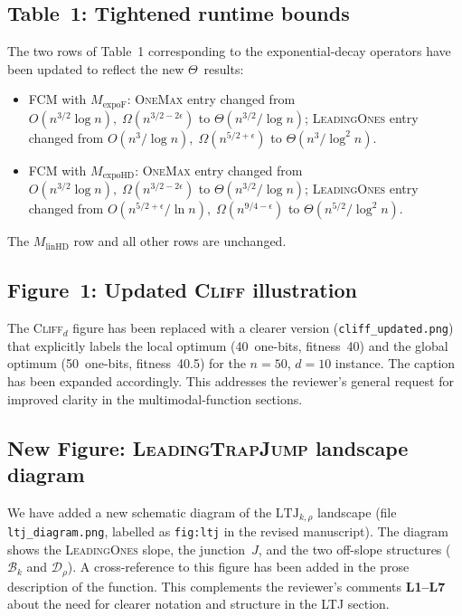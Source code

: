 \documentclass[11pt]{article}
\newcommand{\resp}[1]{\smallskip\noindent #1\medskip}
\begin{document}
\subsection*{Table~1: Tightened runtime bounds}

\resp{The two rows of Table~1 corresponding to the exponential-decay
operators have been updated to reflect the new $\Theta$~results:
\begin{itemize}[nosep]
\item FCM with $M_{\text{expoF}}$: \textsc{OneMax} entry changed from
      $O(n^{3/2}\log n),\;\Omega(n^{3/2-2\epsilon})$ to
      $\Theta(n^{3/2}/\!\log n)$; \textsc{LeadingOnes} entry changed from
      $O(n^3/\!\log n),\;\Omega(n^{5/2+\epsilon})$ to
      $\Theta(n^3/\!\log^2 n)$.
\item FCM with $M_{\text{expoHD}}$: \textsc{OneMax} entry changed from
      $O(n^{3/2}\log n),\;\Omega(n^{3/2-2\epsilon})$ to
      $\Theta(n^{3/2}/\!\log n)$; \textsc{LeadingOnes} entry changed from
      $O(n^{5/2+\epsilon}/\!\ln n),\;\Omega(n^{9/4-\epsilon})$ to
      $\Theta(n^{5/2}/\!\log^2 n)$.
\end{itemize}
The $M_{\text{linHD}}$ row and all other rows are unchanged.}

\subsection*{Figure~1: Updated \textsc{Cliff} illustration}

\resp{The \textsc{Cliff}$_d$ figure has been replaced with a clearer version
(\texttt{cliff\_updated.png}) that explicitly labels the local optimum
(40~one-bits, fitness~40) and the global optimum (50~one-bits, fitness~40.5)
for the $n=50$, $d=10$ instance.  The caption has been expanded accordingly.
This addresses the reviewer's general request for improved clarity in the
multimodal-function sections.}

\subsection*{New Figure: \textsc{LeadingTrapJump} landscape diagram}

\resp{We have added a new schematic diagram of the
$\mathrm{LTJ}_{k,\rho}$ landscape (file \texttt{ltj\_diagram.png},
labelled as \texttt{fig:ltj} in the revised manuscript).
The diagram shows the \textsc{LeadingOnes} slope, the junction~$J$, and
the two off-slope structures ($\mathcal{B}_k$ and $\mathcal{D}_\rho$).
A cross-reference to this figure has been added in the prose description
of the function.  This complements the reviewer's comments \textbf{L1--L7}
about the need for clearer notation and structure in the LTJ section.}
\end{document}
